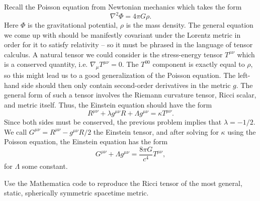 \documentclass{../../templates/lkx_pset}
\begin{document}
\begin{solution}
	Recall the Poisson equation from Newtonian mechanics which takes the form
	\[
		\nabla^2 \Phi = 4\pi G \rho.
	\]
	Here $\Phi$ is the gravitational potential, $\rho$ is the mass density. The general equation we come up with should be manifestly covariant under the Lorentz metric in order for it to satisfy relativity -- so it must be phrased in the language of tensor calculus. A natural tensor we could consider is the stress-energy tensor $T^{\mu\nu}$ which is a conserved quantity, i.e. $\nabla_\mu T^{\mu\nu} = 0$. The $T^{00}$ component is exactly equal to $\rho$, so this might lead us to a good generalization of the Poisson equation. The left-hand side should then only contain second-order derivatives in the metric $g$. The general form of such a tensor involves the Riemann curvature tensor, Ricci scalar, and metric itself. Thus, the Einstein equation should have the form
	\[
		R^{\mu\nu} + \lambda g^{\mu\nu} R + \Lambda g^{\mu\nu} = \kappa T^{\mu\nu}.
	\]
	Since both sides must be conserved, the previous problem implies that $\lambda=-1/2$. We call $G^{\mu\nu} = R^{\mu\nu}-g^{\mu\nu}R/2$ the Einstein tensor, and after solving for $\kappa$ using the Poisson equation, the Einstein equation has the form
	\[
		G^{\mu\nu} + \Lambda g^{\mu\nu} = \frac{8\pi G}{c^4}T^{\mu\nu},
	\]
	for $\Lambda$ some constant.
\end{solution}

\begin{problem}{7}
Use the Mathematica code to reproduce the Ricci tensor of the most general, static, spherically symmetric spacetime metric.
\end{problem}
\end{document}
